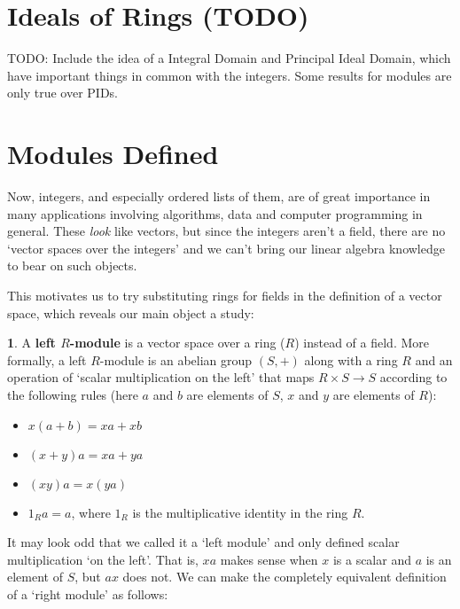 \documentclass[oneside,english]{amsbook}
\numberwithin{section}{chapter}
\theoremstyle{plain}
\theoremstyle{definition}
\newtheorem{defn}[thm]{\protect\definitionname}
\providecommand{\definitionname}{Definition}
\begin{document}
		\section{Ideals of Rings (TODO)}
		
			TODO: Include the idea of a Integral Domain and Principal Ideal Domain, which have important things in common with the integers. Some results for modules are only true over PIDs.
		
		\section{Modules Defined}
				
			Now, integers, and especially ordered lists of them, are of great importance in many applications involving algorithms, data and computer programming in general. These \emph{look} like vectors, but since the integers aren't a field, there are no `vector spaces over the integers' and we can't bring our linear algebra knowledge to bear on such objects. 
			
			This motivates us to try substituting rings for fields in the definition of a vector space, which reveals our main object a study:
			
			\begin{defn}
				A \textbf{left $R$-module} is a vector space over a ring ($R$) instead of a field. More formally, a left $R$-module is an abelian group $(S, +)$ along with a ring $R$ and an operation of `scalar multiplication on the left' that maps $R\times S\to S$ according to the following rules (here $a$ and $b$ are elements of $S$, $x$ and $y$ are elements of $R$):
				\begin{itemize}
					\item $x(a + b) = xa + xb$ 
					\item $(x + y)a = xa + ya$
					\item $(xy)a = x(ya)$
					\item $1_Ra = a$, where $1_R$ is the multiplicative identity in the ring $R$.
				\end{itemize}
			\end{defn}
			
			It may look odd that we called it a `left module' and only defined scalar multiplication `on the left'. That is, $xa$ makes sense when $x$ is a scalar and $a$ is an element of $S$, but $ax$ does not. We can make the completely equivalent definition of a `right module' as follows:
			
\end{document}
